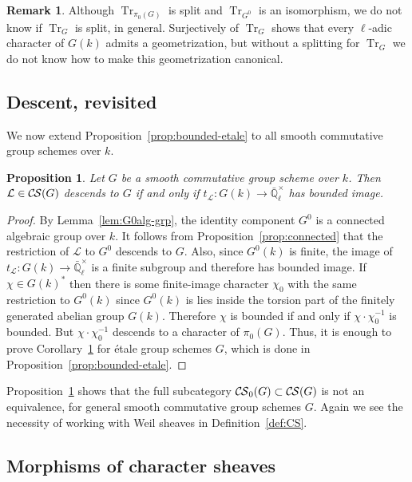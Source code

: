 \documentclass[10pt]{amsart}
\theoremstyle{plain}
\newtheorem{proposition}[theorem]{Proposition}
\theoremstyle{definition}
\newtheorem{remark}[theorem]{Remark}
\newcommand{\EE}{\mathbb{\bar Q}_\ell}
\newcommand{\Fq}{k}
\newcommand{\EEx}{\EE^\times}
\newcommand{\trFrob}[1]{t_{#1}}
\newcommand{\TrFrob}[1]{\operatorname{Tr}_{#1}}
\newcommand{\cs}[1]{{\mathcal{#1}}}
\newcommand{\CS}{{\mathcal{C\hskip-0.8pt S}}}
\newcommand{\bCS}{{\CS_0}}
\begin{document}
\begin{remark}\label{rem:rats}
Although $\TrFrob{\pi_0(G)}$ is split and $\TrFrob{G^0}$ is an isomorphism, we do not know if $\TrFrob{G}$ is split,
in general. Surjectively of $\TrFrob{G}$ shows that every $\ell$-adic character of $G(\Fq)$ admits a geometrization,
but without a splitting for $\TrFrob{G}$ we do not know how to make this geometrization canonical.
\end{remark}


\subsection{Descent, revisited}\label{ssec:revisited}

We now extend Proposition~\ref{prop:bounded-etale} to all smooth commutative group schemes over $\Fq$.

\begin{proposition} \label{prop:bounded}
Let $G$ be a smooth commutative group scheme over $\Fq$. 
Then $\cs{L}\in \CS(G)$ descends to $G$ if and only if $\trFrob{\cs{L}} : G(\Fq) \to \EEx$ has bounded image.
\end{proposition}
\begin{proof} 
By Lemma~\ref{lem:G0alg-grp}, the identity component $G^0$ is a connected algebraic group over $\Fq$. 
It follows from Proposition~\ref{prop:connected} that the restriction of $\cs{L}$ to $G^0$ descends to $G$. 
Also, since $G^0(\Fq)$ is finite, the image of $\trFrob{\cs{L}} : G(\Fq) \to \EEx$ is a finite subgroup and therefore has bounded image.  
%
If $\chi \in G(\Fq)^*$ then there is some finite-image character $\chi_0$
with the same restriction to $G^0(\Fq)$ since $G^0(\Fq)$ is lies inside the torsion part of
the finitely generated abelian group $G(\Fq)$.  Therefore $\chi$ is bounded 
if and only if $\chi \cdot \chi_0^{-1}$ is bounded.  But $\chi \cdot \chi_0^{-1}$ descends
to a character of $\pi_0(G)$.
Thus, it is enough to prove Corollary~\ref{prop:bounded}
for \'etale group schemes $G$, which is done in Proposition~\ref{prop:bounded-etale}.
\end{proof}

Proposition~\ref{prop:bounded} shows that the full subcategory
$\bCS(G) \subset \CS(G)$ is not an equivalence, for general smooth commutative group schemes $G$.
Again we see the necessity of working with Weil sheaves in Definition~\ref{def:CS}.

\subsection{Morphisms of character sheaves} \label{ssec:CSmor}
\end{document}
